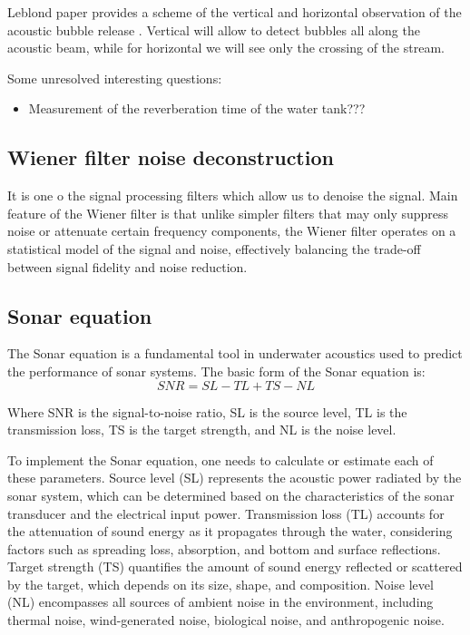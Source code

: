 \documentclass[11pt]{article}
\begin{document}
Leblond paper provides a scheme of the vertical and horizontal observation of the acoustic bubble release \cite*{leblond_acoustic_2014}. Vertical will allow to detect bubbles all along the acoustic beam, while for horizontal we will see only the crossing of the stream.

Some unresolved interesting questions:
\begin{itemize}
    \item Measurement of the reverberation time of the water tank???
\end{itemize}

\subsection*{Wiener filter noise deconstruction}

It is one o the signal processing filters which allow us to denoise the signal. Main feature of the Wiener filter is 
that unlike simpler filters that may only suppress noise or attenuate certain frequency components, the Wiener filter operates on a statistical model of the signal and noise, effectively balancing the trade-off between signal fidelity and noise reduction.

\subsection*{Sonar equation }
The Sonar equation is a fundamental tool in underwater acoustics used to predict the performance of sonar systems. 
The basic form of the Sonar equation is:
\begin{equation}
    SNR=SL-TL+TS-NL
\end{equation}

Where
SNR is the signal-to-noise ratio,
SL is the source level,
TL is the transmission loss,
TS is the target strength, and
NL is the noise level.

To implement the Sonar equation, one needs to calculate or estimate each of these parameters. 
Source level (SL) represents the acoustic power radiated by the sonar system, which can be determined based on the characteristics of the sonar transducer and the electrical input power. 
Transmission loss (TL) accounts for the attenuation of sound energy as it propagates through the water, considering factors such as spreading loss, absorption, and bottom and surface reflections. 
Target strength (TS) quantifies the amount of sound energy reflected or scattered by the target, which depends on its size, shape, and composition. 
Noise level (NL) encompasses all sources of ambient noise in the environment, including thermal noise, wind-generated noise, biological noise, and anthropogenic noise.
\end{document}
